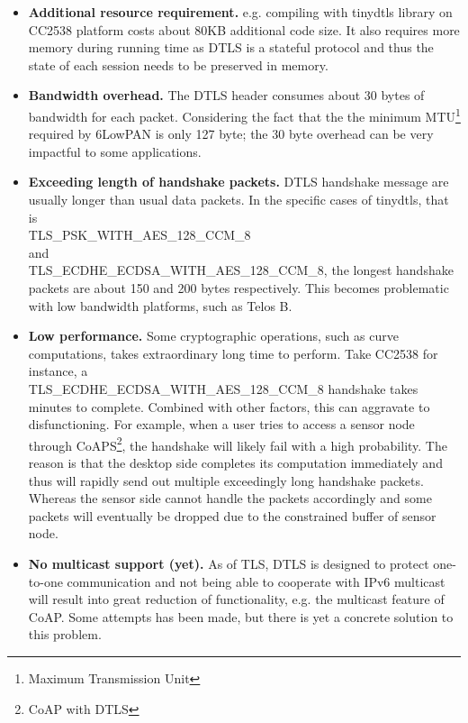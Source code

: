 \begin{itemize}
\item \textbf{Additional resource requirement.} e.g. compiling with tinydtls library on CC2538 platform costs about 80KB additional code size. It also requires more memory during running time as DTLS is a stateful protocol and thus the state of each session needs to be preserved in memory.
\item \textbf{Bandwidth overhead.} The DTLS header consumes about 30 bytes of bandwidth for each packet. Considering the fact that the the minimum MTU\footnote{Maximum Transmission Unit} required by 6LowPAN is only 127 byte; the 30 byte overhead can be very impactful to some applications. 
\item \textbf{Exceeding length of handshake packets.} DTLS handshake message are usually longer than usual data packets. In the specific cases of tinydtls, that is\\ TLS\_PSK\_WITH\_AES\_128\_CCM\_8 \\
and \\
TLS\_ECDHE\_ECDSA\_WITH\_AES\_128\_CCM\_8, the longest handshake packets are about 150 and 200 bytes respectively. This becomes problematic with low bandwidth platforms, such as Telos B.
\item\textbf{Low performance.} Some cryptographic operations, such as curve computations, takes extraordinary long time to perform. Take  CC2538 for instance, a \\ TLS\_ECDHE\_ECDSA\_WITH\_AES\_128\_CCM\_8 handshake takes minutes to complete. Combined with other factors, this can aggravate to disfunctioning. For example, when a user tries to access a sensor node through CoAPS\footnote{CoAP with DTLS}, the handshake will likely fail with a high probability. The reason is that the desktop side completes its computation immediately and thus will rapidly send out multiple exceedingly long handshake packets. Whereas the sensor side cannot handle the packets accordingly and some packets will eventually be dropped due to the constrained buffer of sensor node.
\item \textbf{No multicast support (yet).} As of TLS, DTLS is designed to protect one-to-one communication and not being able to cooperate with IPv6 multicast will result into great reduction of functionality, e.g. the multicast feature of CoAP. Some attempts\cite{multicast1}\cite{multicast2} has been made, but there is yet a concrete solution to this problem.
\end{itemize}

